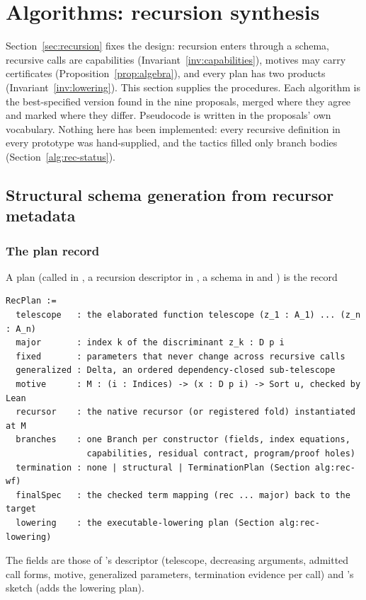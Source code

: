 \section{Algorithms: recursion synthesis}\label{alg:recursion}

Section~\ref{sec:recursion} fixes the design: recursion enters through a schema, recursive calls are capabilities (Invariant~\ref{inv:capabilities}), motives may carry certificates (Proposition~\ref{prop:algebra}), and every plan has two products (Invariant~\ref{inv:lowering}). This section supplies the procedures. Each algorithm is the best-specified version found in the nine proposals, merged where they agree and marked where they differ. Pseudocode is written in the proposals' own vocabulary. Nothing here has been implemented: every recursive definition in every prototype was hand-supplied, and the tactics filled only branch bodies (Section~\ref{alg:rec-status}).

\subsection{Structural schema generation from recursor metadata}\label{alg:rec-structural}

\subsubsection{The plan record}

\begin{definition}
A plan (called  in , a recursion descriptor in , a schema in  and ) is the record
\begin{lstlisting}
RecPlan :=
  telescope   : the elaborated function telescope (z_1 : A_1) ... (z_n : A_n)
  major       : index k of the discriminant z_k : D p i
  fixed       : parameters that never change across recursive calls
  generalized : Delta, an ordered dependency-closed sub-telescope
  motive      : M : (i : Indices) -> (x : D p i) -> Sort u, checked by Lean
  recursor    : the native recursor (or registered fold) instantiated at M
  branches    : one Branch per constructor (fields, index equations,
                capabilities, residual contract, program/proof holes)
  termination : none | structural | TerminationPlan (Section alg:rec-wf)
  finalSpec   : the checked term mapping (rec ... major) back to the target
  lowering    : the executable-lowering plan (Section alg:rec-lowering)
\end{lstlisting}
The fields are those of 's descriptor (telescope, decreasing arguments, admitted call forms, motive, generalized parameters, termination evidence per call) and 's sketch (adds the lowering plan).
\end{definition}

